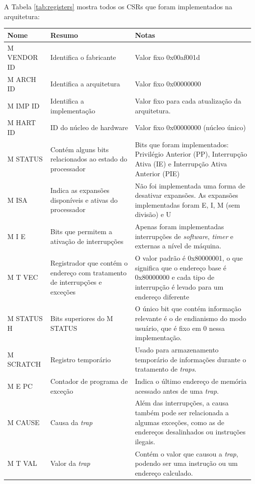 \documentclass[
	12pt,				%
	openright,			%
	oneside,			%
	a4paper,			%
	english,			%
	french,				%
	spanish,			%
	brazil,				%
	]{abntex2}
\begin{document}
A Tabela \ref{tab:registers} mostra todos os CSRs que foram implementados na arquitetura:
{\fontsize{11}{13}\selectfont
\begin{longtable}{|p{3cm}|p{5cm}|p{8cm}|}
\hline
\textbf{Nome} & \textbf{Resumo} & \textbf{Notas} \\
\hline
M VENDOR ID & Identifica o fabricante & Valor fixo 0x00af001d \\
\hline
M ARCH ID & Identifica a arquitetura & Valor fixo 0x00000000 \\
\hline
M IMP ID & Identifica a implementação & Valor fixo para cada atualização da arquitetura. \\
\hline
M HART ID & ID do núcleo de hardware & Valor fixo 0x00000000 (núcleo único) \\
\hline
M STATUS & Contém alguns bits relacionados ao estado do processador & Bits que foram implementados: Privilégio Anterior (PP), Interrupção Ativa (IE) e Interrupção Ativa Anterior (PIE) \\
\hline
M ISA & Indica as expansões disponíveis e ativas do processador & Não foi implementada uma forma de desativar expansões. As expansões implementadas foram E, I, M (sem divisão) e U \\
\hline
M I E & Bits que permitem a ativação de interrupções & Apenas foram implementadas interrupções de \textit{software}, \textit{timer} e externas a nível de máquina. \\
\hline
M T VEC & Registrador que contém o endereço com tratamento de interrupções e exceções & O valor padrão é 0x80000001, o que significa que o endereço base é 0x80000000 e cada tipo de interrupção é levado para um endereço diferente \\
\hline
M STATUS H & Bits superiores do M STATUS & O único bit que contém informação relevante é o de endianismo do modo usuário, que é fixo em 0 nessa implementação. \\
\hline
M SCRATCH & Registro temporário & Usado para armazenamento temporário de informações durante o tratamento de \textit{traps}. \\
\hline
M E PC & Contador de programa de exceção & Indica o último endereço de memória acessado antes de uma \textit{trap}. \\
\hline
M CAUSE & Causa da \textit{trap} & Além das interrupções, a causa também pode ser relacionada a algumas exceções, como as de endereços desalinhados ou instruções ilegais. \\
\hline
M T VAL & Valor da \textit{trap} & Contém o valor que causou a \textit{trap}, podendo ser uma instrução ou um endereço calculado. \\

\end{longtable}}
\end{document}
